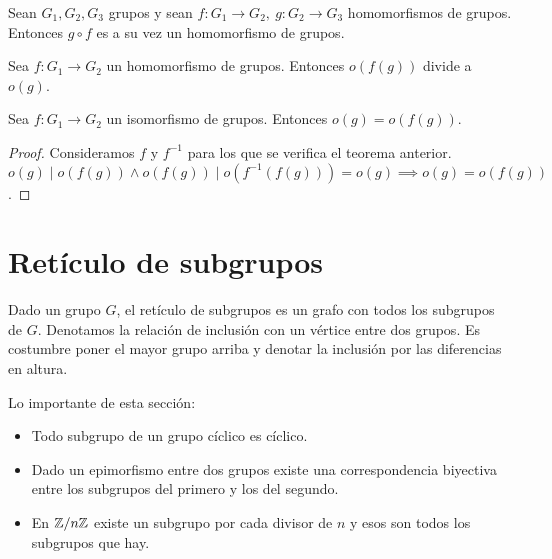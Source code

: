 \begin{pro}
	Sean $G_1, G_2, G_3$ grupos y sean $f:G_1 \to G_2,\ g:G_2 \to G_3$ homomorfismos de grupos. Entonces $g \circ f$ es a su vez un homomorfismo de grupos.
\end{pro}

\begin{thm}
	Sea $f:G_1 \to G_2$ un homomorfismo de grupos. Entonces $o(f(g))$ divide a $o(g)$.
\end{thm}

\begin{thm}
	Sea $f:G_1 \to G_2$ un isomorfismo de grupos. Entonces $o(g) = o(f(g))$.
\end{thm}

\begin{proof}
	Consideramos $f$ y $f^{-1}$ para los que se verifica el teorema anterior. $o(g) \mid o(f(g)) \land o(f(g)) \mid o(f^{-1}(f(g))) = o(g) \implies o(g) = o(f(g))$. 
\end{proof}


\section{Retículo de subgrupos}

\begin{dfn}
	Dado un grupo $G$, el retículo de subgrupos es un grafo con todos los subgrupos de $G$. Denotamos la relación de inclusión con un vértice entre dos grupos. Es costumbre poner el mayor grupo arriba y denotar la inclusión por las diferencias en altura.
\end{dfn}

Lo importante de esta sección:
\begin{itemize}
	\item Todo subgrupo de un grupo cíclico es cíclico.
	\item Dado un epimorfismo entre dos grupos existe una correspondencia biyectiva entre los subgrupos del primero y los del segundo.
	\item En $\mathbb{Z}/n\mathbb{Z}$ existe un subgrupo por cada divisor de $n$ y esos son todos los subgrupos que hay.
\end{itemize}

